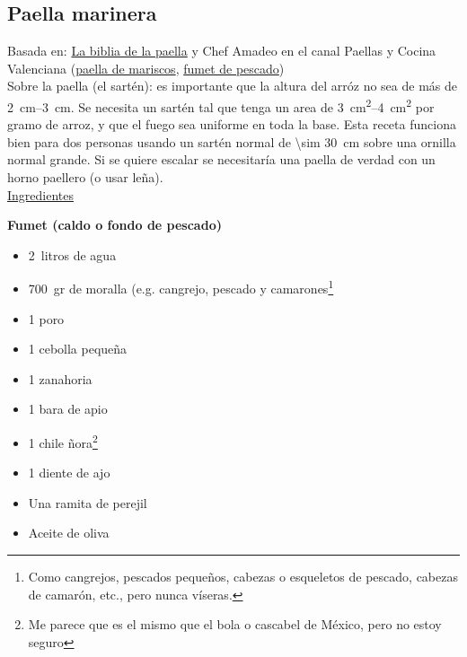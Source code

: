 \subsection{Paella marinera}

Basada en: \href{https://www.la-biblia-de-la-paella.es/recette/paella-de-marisco/}{La biblia de la paella} y Chef Amadeo en el canal Paellas y Cocina Valenciana (\href{https://www.youtube.com/watch?v=WbaWsTqg9CY}{paella de mariscos}, \href{https://www.youtube.com/watch?v=rem5NKXjEBo}{fumet de pescado}) \\

Sobre la paella (el sartén): es importante que la altura del arróz no sea de más de \SIrange{2}{3}{cm}. Se necesita un sartén tal que tenga un area de \SIrange{3}{4}{cm^2} por gramo de arroz, y que el fuego sea uniforme en toda la base. Esta receta funciona bien para dos personas usando un sartén normal de \SI{\sim 30}{cm} sobre una ornilla normal grande. Si se quiere escalar se necesitaría una paella de verdad con un horno paellero (o usar leña).\\

\underline{Ingredientes}

\textbf{Fumet (caldo o fondo de pescado)}
\begin{itemize}
\item \SI{2}{litros} de agua
\item \SI{700}{gr} de moralla (e.g. cangrejo, pescado y camarones\footnote{Como cangrejos, pescados pequeños, cabezas o esqueletos de pescado, cabezas de camarón, etc., pero nunca víseras.}
\item 1 poro
\item 1 cebolla pequeña
\item 1 zanahoria
\item 1 bara de apio
\item 1 chile ñora\footnote{Me parece que es el mismo que el bola o cascabel de México, pero no estoy seguro}
\item 1 diente de ajo
\item Una ramita de perejil
\item Aceite de oliva
\end{itemize}

